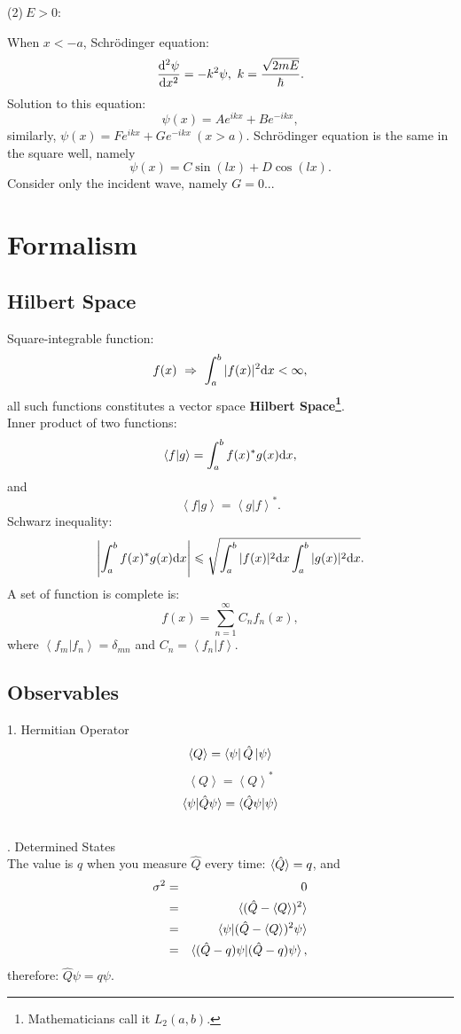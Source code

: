 \documentclass[12pt, 
]{article}
\begin{document}
\noindent (2)$~E>0$:

\noindent When $x<-a$, Schr\"odinger equation:
\[
	\frac{{\rm d}^2\psi}{{\rm d}x^2}=-k^2\psi, ~k=\frac{\sqrt{2mE}}{\hbar}.
\]
Solution to this equation:
\[
	\psi(x)=Ae^{ikx}+Be^{-ikx},
\]
similarly, $\psi(x)=Fe^{ikx}+Ge^{-ikx}~(x>a)$.
Schr\"odinger equation is the same in the square well, namely
\[
	\psi(x)=C\sin(lx)+D\cos(lx).
\]
Consider only the incident wave, namely $G=0$...
\newpage

\section{Formalism}
\subsection{Hilbert Space}
Square-integrable function:
\[
	f(x)~\Rightarrow~\int_a^b|f(x)|^2{\rm d}x<\infty,
\]
all such functions constitutes a vector space {\bf Hilbert Space\footnote{Mathematicians call it $L_2(a,b)$.}}.\\
Inner product of two functions:
\[
	\left<f|g\right>=\int_a^bf(x)^*g(x){\rm d}x,
\]
and
\[
	\left<f|g\right>=\left<g|f\right>^*.
\]
Schwarz inequality:
\begin{equation}\label{eq:14}
	\left|\int_a^bf(x)^*g(x){\rm d}x\right|\leqslant\sqrt{\int_a^b|f(x)|^2{\rm d}x\int_a^b|g(x)|^2{\rm d}x}.
\end{equation}
A set of function is complete is:
\[
	f(x)=\sum_{n=1}^\infty C_nf_n(x),
\]
where $\left<f_m|f_n\right>=\delta_{mn}$ and $C_n=\left<f_n|f\right>$.

\subsection{Observables}
1. Hermitian Operator
\[
	\left<Q\right>=\bra{\psi}\hat{Q}\ket{\psi}
\]
\[
	\left<Q\right>=\left<Q\right>^*
\]
\[
	\braket{\psi|\hat{Q}\psi}=\braket{\hat{Q}\psi|\psi}
\]
~\\

. Determined States\\
The value is $q$ when you measure $\hat{Q}$ every time: $\braket{\hat{Q}}=q$, and 
\begin{eqnarray*}
	\sigma^2&=&0\\
	&=&\braket{(\hat{Q}-\braket{Q})^2}\\
	&=&\braket{\psi|(\hat{Q}-\braket{Q})^2\psi}\\
	&=&\braket{(\hat{Q}-q)\psi|(\hat{Q}-q)\psi},
\end{eqnarray*}
therefore: $\hat{Q}\psi=q\psi$.
\end{document}

